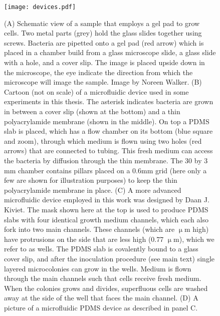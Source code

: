 %
%

\begin{figure}
	\centering
	\texttt{[image: devices.pdf]}
	\caption{ 
		(A) Schematic view of a sample that employs a gel pad to grow cells. Two metal parts (grey) hold the glass slides together using screws. Bacteria are pipetted onto a gel pad (red arrow) which is placed in a chamber build from a glass microscope slide, a glass slide with a hole, and a cover slip. The image is placed upside down in the microscope, the eye indicate the direction from which the microscope will image the sample. Image by Noreen Walker.
		(B) Cartoon (not on scale) of a microfluidic device used in some experiments in this thesis. 
		The asterisk indicates bacteria are grown in between a cover slip (shown at the bottom) and a thin polyacrylamide membrane (shown in the middle).
		On top a PDMS slab is placed, which has a flow chamber on its bottom (blue square and zoom), through which medium is flown using two holes (red arrows) that are connected to tubing. 
		This fresh medium can access the bacteria by diffusion through the thin membrane. 
		The 30 by 3 mm chamber contains pillars placed on a 0.6mm grid (here only a few are shown for illustration purposes) to keep the thin polyacrylamide membrane in place. 
		(C) A more advanced microfluidic device employed in this work was designed by Daan J. Kiviet. 
		The mask shown here at the top is used to produce PDMS slabs with four identical growth medium channels, which each also fork into two main channels. 
		These channels (which are  $\upmu$m high) have protrusions on the side that are less high (0.77 $\upmu$m), which we refer to as wells.
		The PDMS slab is covalently bound to a glass cover slip, and after the inoculation procedure (see main text) single layered microcolonies can grow in the wells.
		Medium is flown through the main channels such that cells receive fresh medium. 
		When the colonies grows and divides, superfluous cells are washed away at the side of the well that faces the main channel.		
		(D) A picture of a microfluidic PDMS device as described in panel C.
	}
	\label{fig:mm:devices}
\end{figure}


